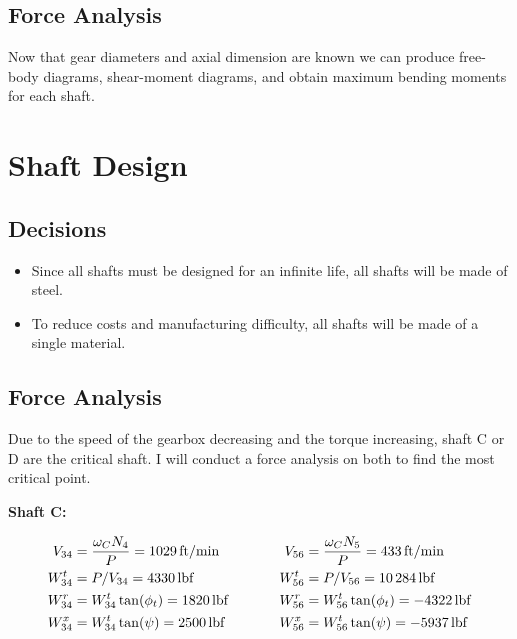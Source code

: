 \documentclass[titlepage]{article} %
\begin{document}
\subsection{Force Analysis}
Now that gear diameters and axial dimension are known we can produce free-body
diagrams, shear-moment diagrams, and obtain maximum bending moments for each
shaft.


\section{Shaft Design}

\subsection{Decisions}

\begin{itemize}
    \item Since all shafts must be designed for an infinite life, all shafts will
    be made of steel.
    \item To reduce costs and manufacturing difficulty, all shafts will be made
    of a single material.
\end{itemize}

\subsection{Force Analysis}

Due to the speed of the gearbox decreasing and the torque increasing, shaft C or
D are the critical shaft. I will conduct a force analysis on both to find the
most critical point. 

\textbf{Shaft C:}

\begin{equation*}
\begin{split}
    V_{34} &= \frac{\omega_C N_4}{P} = \SI{1029}{ft/min} \\
    W_{34}^t &= P/V_{34} = \SI{4330}{lbf} \\
    W_{34}^r &= W_{34}^t \tan(\phi_t) = \SI{1820}{lbf} \\
    W_{34}^x &= W_{34}^t \tan(\psi) = \SI{2500}{lbf} 
\end{split}
\hspace{0.5in}
\begin{split}
    V_{56} &= \frac{\omega_C N_5}{P} = \SI{433}{ft/min}\\
    W_{56}^t &= P/V_{56} = \SI{10284}{lbf} \\
    W_{56}^r &= W_{56}^t \tan(\phi_t) = \SI{-4322}{lbf} \\
    W_{56}^x &= W_{56}^t \tan(\psi) = \SI{-5937}{lbf} 
\end{split}
\end{equation*}
\end{document}
